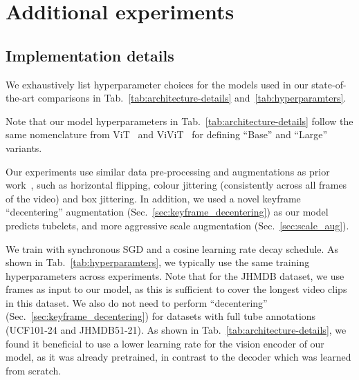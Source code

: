\documentclass[10pt,twocolumn,letterpaper]{article}
\begin{document}
{\small


}

\appendix

\section{Additional experiments}
\label{sec:app_experiments}

\subsection{Implementation details}

We exhaustively list hyperparameter choices for the models used in our state-of-the-art comparisons in Tab.~\ref{tab:architecture-details} and~\ref{tab:hyperparamters}.

Note that our model hyperparameters in Tab.~\ref{tab:architecture-details} follow the same nomenclature from ViT~\cite{dosovitskiy_iclr_2021} and ViViT~\cite{arnab2021vivit} for defining ``Base'' and ``Large'' variants.

Our experiments use similar data pre-processing and augmentations as prior work~\cite{feichtenhofer_iccv_2019, wu2022memvit, wu_cvpr_2019}, such as horizontal flipping, colour jittering (consistently across all frames of the video) and box jittering.
In addition, we used a novel keyframe ``decentering'' augmentation (Sec.~\ref{sec:keyframe_decentering}) as our model predicts tubelets, and more aggressive scale augmentation (Sec.~\ref{sec:scale_aug}).

We train with synchronous SGD and a cosine learning rate decay schedule.
As shown in Tab.~\ref{tab:hyperparamters}, we typically use the same training hyperparameters across experiments.
Note that for the JHMDB dataset, we use  frames as input to our model, as this is sufficient to cover the longest video clips in this dataset.
We also do not need to perform ``decentering'' (Sec.~\ref{sec:keyframe_decentering}) for datasets with full tube annotations (UCF101-24 and JHMDB51-21).
As shown in Tab.~\ref{tab:architecture-details}, we found it beneficial to use a lower learning rate for the vision encoder of our model, as it was already pretrained, in contrast to the decoder which was learned from scratch.
\end{document}

